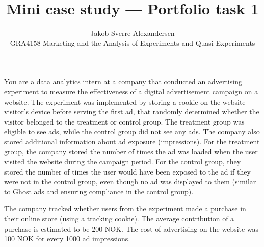 \documentclass[10pt]{article}
\begin{document}
 
\title{Mini case study --- Portfolio task 1}
\author{Jakob Sverre Alexandersen\\
GRA4158 Marketing and the Analysis of Experiments and Quasi-Experiments}
\maketitle

You are a data analytics intern at a company that conducted an advertising experiment to
measure the effectiveness of a digital advertisement campaign on a website. The experiment
was implemented by storing a cookie on the website visitor's device before serving the first ad,
that randomly determined whether the visitor belonged to the treatment or control group. The
treatment group was eligible to see ads, while the control group did not see any ads. The
company also stored additional information about ad exposure (impressions). For the treatment
group, the company stored the number of times the ad was loaded when the user visited the
website during the campaign period. For the control group, they stored the number of times the
user would have been exposed to the ad if they were not in the control group, even though no
ad was displayed to them (similar to Ghost ads and ensuring compliance in the control group).

The company tracked whether users from the experiment made a purchase in their online store
(using a tracking cookie). The average contribution of a purchase is estimated to be 200 NOK.
The cost of advertising on the website was 100 NOK for every 1000 ad impressions.
\end{document}
